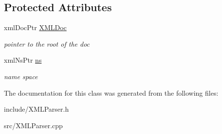 \subsection*{Protected Attributes}
\begin{DoxyCompactItemize}
\item 
\mbox{\label{classXMLParser_acd381a514d6f6e7643b1e374e9ab4636}} 
xml\+Doc\+Ptr \hyperlink{classXMLParser_acd381a514d6f6e7643b1e374e9ab4636}{X\+M\+L\+Doc}
\begin{DoxyCompactList}\small\item\em pointer to the root of the doc \end{DoxyCompactList}\item 
\mbox{\label{classXMLParser_ab061846f72bd074b3859b5dc44d60187}} 
xml\+Ns\+Ptr \hyperlink{classXMLParser_ab061846f72bd074b3859b5dc44d60187}{ns}
\begin{DoxyCompactList}\small\item\em name space \end{DoxyCompactList}\end{DoxyCompactItemize}


The documentation for this class was generated from the following files\+:\begin{DoxyCompactItemize}
\item 
include/X\+M\+L\+Parser.\+h\item 
src/X\+M\+L\+Parser.\+cpp\end{DoxyCompactItemize}
